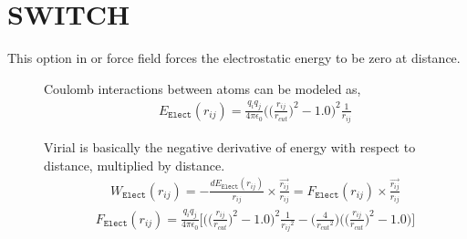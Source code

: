 \documentclass[letterpaper,10pt,english]{sphinxmanual}
\begin{document}
\section{SWITCH}
\label{\detokenize{electrostatic:switch}}
This option in  or  force field forces the electrostatic energy to be zero at  distance.
\begin{description}
\item[{}] \leavevmode
Coulomb interactions between atoms can be modeled as,
\begin{equation*}
\begin{split}E_{\texttt{Elect}}(r_{ij}) = \frac{q_i q_j}{4\pi \epsilon_0} \bigg( \Big(\frac{r_{ij}}{r_{cut}} \Big)^2 - 1.0\bigg)^2 \frac{1}{r_{ij}}\end{split}
\end{equation*}
\item[{}] \leavevmode
Virial is basically the negative derivative of energy with respect to distance, multiplied by distance.
\begin{equation*}
\begin{split}W_{\texttt{Elect}}(r_{ij}) = -\frac{dE_{\texttt{Elect}}(r_{ij})}{r_{ij}}\times \frac{\overrightarrow{r_{ij}}}{{r_{ij}}} = F_{\texttt{Elect}}(r_{ij}) \times \frac{\overrightarrow{r_{ij}}}{{r_{ij}}}\end{split}
\end{equation*}\begin{equation*}
\begin{split}F_{\texttt{Elect}}(r_{ij}) = \frac{q_i q_j}{4\pi \epsilon_0} \Bigg[ \bigg( \Big(\frac{r_{ij}}{r_{cut}} \Big)^2 - 1.0\bigg)^2 \frac{1}{{r_{ij}}^2} - \bigg( \frac{4}{{r_{cut}}^2} \bigg) \bigg( \Big(\frac{r_{ij}}{r_{cut}} \Big)^2 - 1.0\bigg) \Bigg]\end{split}
\end{equation*}
\end{description}
\end{document}

